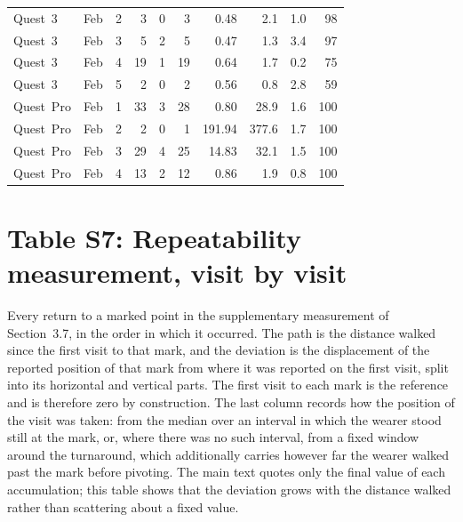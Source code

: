 \documentclass[11pt,a4paper]{article}
\begin{document}
{\begin{longtable}{llrrrrrrrr}
Quest~3 & Feb & 2 & 3 & 0 & 3 & 0.48 & 2.1 & 1.0 & 98 \\
Quest~3 & Feb & 3 & 5 & 2 & 5 & 0.47 & 1.3 & 3.4 & 97 \\
Quest~3 & Feb & 4 & 19 & 1 & 19 & 0.64 & 1.7 & 0.2 & 75 \\
Quest~3 & Feb & 5 & 2 & 0 & 2 & 0.56 & 0.8 & 2.8 & 59 \\
Quest~Pro & Feb & 1 & 33 & 3 & 28 & 0.80 & 28.9 & 1.6 & 100 \\
Quest~Pro & Feb & 2 & 2 & 0 & 1 & 191.94 & 377.6 & 1.7 & 100 \\
Quest~Pro & Feb & 3 & 29 & 4 & 25 & 14.83 & 32.1 & 1.5 & 100 \\
Quest~Pro & Feb & 4 & 13 & 2 & 12 & 0.86 & 1.9 & 0.8 & 100 \\
\end{longtable}
}


\section*{Table S7: Repeatability measurement, visit by visit}

Every return to a marked point in the supplementary measurement of
Section~3.7, in the order in which it occurred. The path is the distance walked
since the first visit to that mark, and the deviation is the displacement of the
reported position of that mark from where it was reported on the first visit,
split into its horizontal and vertical parts. The first visit to each mark is the
reference and is therefore zero by construction. The last column records how the
position of the visit was taken: from the median over an interval in which the
wearer stood still at the mark, or, where there was no such interval, from a
fixed window around the turnaround, which additionally carries however far the
wearer walked past the mark before pivoting. The main text quotes only the final
value of each accumulation; this table shows that the deviation grows with the
distance walked rather than scattering about a fixed value.
\end{document}
